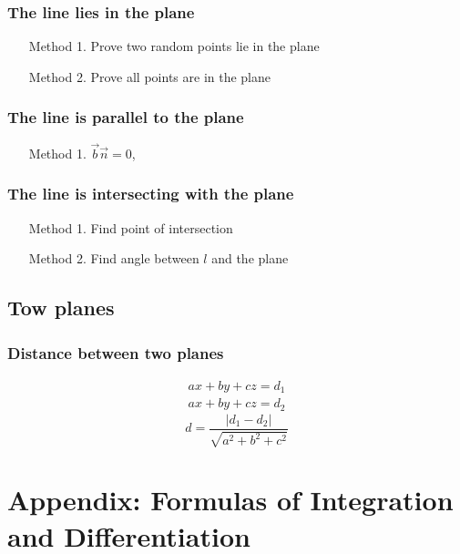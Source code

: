 \documentclass[a4paper,9pt]{scrartcl}
\newcommand{\abs}[1]{\left| #1 \right|}
\begin{document}
    \subsubsection{The line lies in the plane}
    \begin{itemize}
        \item [Method 1.] Prove two random points lie in the plane
        \item [Method 2.] Prove all points are in the plane
    \end{itemize}

    \subsubsection{The line is parallel to the plane}
    \begin{itemize}
        \item [Method 1.] $\vec{b}\vec{n} = 0$,
    \end{itemize}

    \subsubsection{The line is intersecting with the plane}
    \begin{itemize}
        \item [Method 1.] Find point of intersection
        \item [Method 2.] Find angle between $l$ and the plane
    \end{itemize}

    \subsection{Tow planes}

    \subsubsection{Distance between two planes}
    \begin{align}
        ax+by+cz=d_1 \\
        ax+by+cz=d_2
    \end{align}
    \begin{displaymath}
        d = \frac{\abs{d_1 - d_2}}{\sqrt{a^2 + b^2 + c^2}}
    \end{displaymath}


    \section{Appendix: Formulas of Integration and Differentiation}
\end{document}
